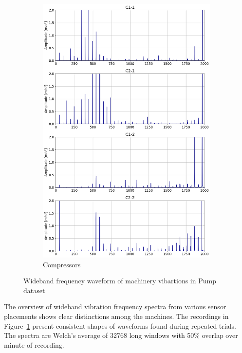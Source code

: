 \begin{figure}[h]
\begin{subfigure}[b]{0.32\textwidth}
        \includegraphics[width=\textwidth]{assets/results/eda/frequency-spectrum-compressors.png}
        \caption{Compressors}
    \end{subfigure} 
    \caption{Wideband frequency waveform of machinery vibartions in Pump dataset}
    \label{fig:evaluation:wideband-frequencies}
\end{figure}

The overview of wideband vibration frequency spectra from various sensor placements shows clear distinctions among the machines. The recordings in Figure~\ref{fig:evaluation:wideband-frequencies} present consistent shapes of waveforms found during repeated trials. The spectra are Welch's average of 32768 long windows with 50\% overlap over minute of recording.

